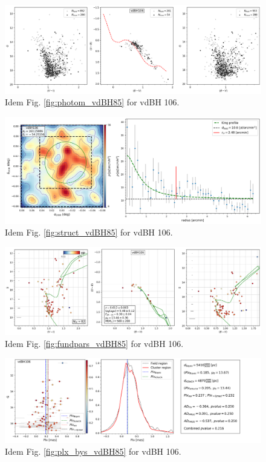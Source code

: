 \documentclass[draft]{aa}
\begin{document}
\begin{figure}[ht]
    \centering
    \includegraphics[width=\hsize]{../figs/obs_vdBH106.png}
    \caption{Idem Fig. \ref{fig:photom_vdBH85} for vdBH 106.}
    \label{fig43}
\end{figure}
\begin{figure}[ht]
    \centering
    \includegraphics[width=\hsize]{../figs/dmap_vdbh106.png}
    \caption{Idem Fig. \ref{fig:struct_vdBH85} for vdBH 106.}
    \label{fig44}
\end{figure}
\begin{figure}[ht]
    \centering
    \includegraphics[width=\hsize]{../figs/cmds_vdbh106.png}
    \caption{Idem Fig. \ref{fig:fundpars_vdBH85} for vdBH 106.}
    \label{fig45}
\end{figure}
\begin{figure}[ht]
    \centering
    \includegraphics[width=\hsize]{../figs/plx_vdBH106.png}
    \caption{Idem Fig. \ref{fig:plx_bys_vdBH85} for vdBH 106.}
    \label{fig46}
\end{figure}
\end{document}

